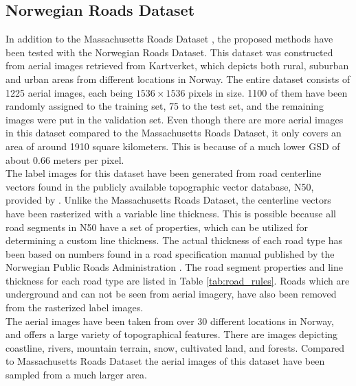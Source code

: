 
\subsection{Norwegian Roads Dataset}
In addition to the Massachusetts Roads Dataset \citep{MnihThesis}, the proposed methods have been tested with the Norwegian Roads Dataset. This dataset was constructed from aerial images retrieved from Kartverket, which depicts both rural, suburban and urban areas from different locations in Norway. The entire dataset consists of 1225 aerial images, each being $1536\times 1536$ pixels in size. 1100 of them have been randomly assigned to the training set, 75 to the test set, and the remaining images were put in the validation set. Even though there are more aerial images in this dataset compared to the Massachusetts Roads Dataset, it only covers an area of around 1910 square kilometers. This is because of a much lower \ac{GSD} of about 0.66 meters per pixel. \\


The label images for this dataset have been generated from road centerline vectors found in the publicly available topographic vector database, N50, provided by \cite{Kartverket}. Unlike the Massachusetts Roads Dataset, the centerline vectors have been rasterized with a variable line thickness. This is possible because all road segments in N50 have a set of properties, which can be utilized for determining a custom line thickness. The actual thickness of each road type has been based on numbers found in a road specification manual published by the Norwegian Public Roads Administration \citep{Norwegian_road_manual}. The road segment properties and line thickness for each road type are listed in Table \ref{tab:road_rules}. Roads which are underground and can not be seen from aerial imagery, have also been removed from the rasterized label images.\\

The aerial images have been taken from over 30 different locations in Norway, and offers a large variety of topographical features. There are images depicting coastline, rivers, mountain terrain, snow, cultivated land, and forests. Compared to Massachusetts Roads Dataset the aerial images of this dataset have been sampled from a much larger area. \\

